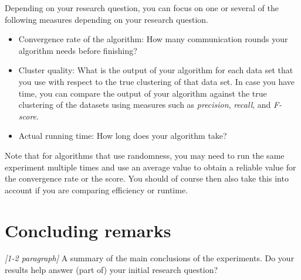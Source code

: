 \documentclass[11pt]{article}
\begin{document}
Depending on your research question, you can focus on one or several of the following measures depending on your research question.
\begin{itemize}
\item Convergence rate of the algorithm: How many communication rounds your algorithm needs before finishing? 

\item Cluster quality: What is the output of your algorithm for each data set that you use with respect to the true clustering of that data set. 
In case you have time, you can compare the output of your algorithm against the true clustering of the datasets using measures such as \emph{precision}, \emph{recall}, and \emph{F-score}. 

\item Actual running time: How long does your algorithm take?
\end{itemize}

Note that for algorithms that use randomness, you may need to run the same experiment multiple times and 
use an average value to obtain a reliable value for the convergence rate or the score. You should of course then also take this into account if you are comparing efficiency or runtime.

\section{Concluding remarks}
\label{se:conclusions}
\emph{[1-2 paragraph]}
A summary of the main conclusions of the experiments. Do your results help answer (part of) your initial research question?
\end{document}
